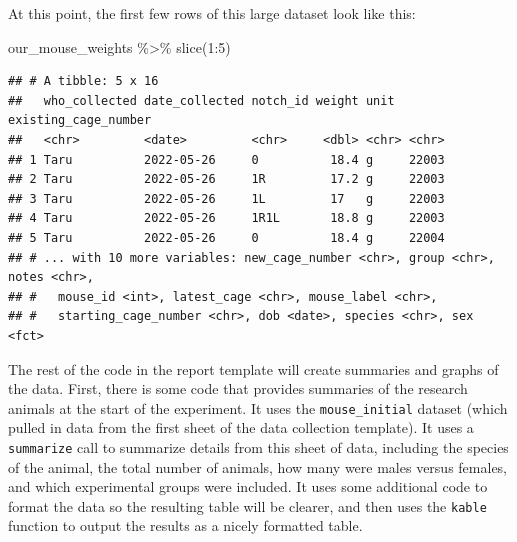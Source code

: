 \documentclass[
]{book}
\newenvironment{Shaded}{\begin{snugshade}}{\end{snugshade}}
\newcommand{\DecValTok}[1]{\textcolor[rgb]{0.00,0.00,0.81}{#1}}
\newcommand{\FunctionTok}[1]{\textcolor[rgb]{0.00,0.00,0.00}{#1}}
\newcommand{\NormalTok}[1]{#1}
\newcommand{\SpecialCharTok}[1]{\textcolor[rgb]{0.00,0.00,0.00}{#1}}
\begin{document}
At this point, the first few rows of this large dataset look like this:

\begin{Shaded}
\begin{Highlighting}[]
\NormalTok{our\_mouse\_weights }\SpecialCharTok{\%\textgreater{}\%} 
  \FunctionTok{slice}\NormalTok{(}\DecValTok{1}\SpecialCharTok{:}\DecValTok{5}\NormalTok{)}
\end{Highlighting}
\end{Shaded}

\begin{verbatim}
## # A tibble: 5 x 16
##   who_collected date_collected notch_id weight unit  existing_cage_number
##   <chr>         <date>         <chr>     <dbl> <chr> <chr>               
## 1 Taru          2022-05-26     0          18.4 g     22003               
## 2 Taru          2022-05-26     1R         17.2 g     22003               
## 3 Taru          2022-05-26     1L         17   g     22003               
## 4 Taru          2022-05-26     1R1L       18.8 g     22003               
## 5 Taru          2022-05-26     0          18.4 g     22004               
## # ... with 10 more variables: new_cage_number <chr>, group <chr>, notes <chr>,
## #   mouse_id <int>, latest_cage <chr>, mouse_label <chr>,
## #   starting_cage_number <chr>, dob <date>, species <chr>, sex <fct>
\end{verbatim}

The rest of the code in the report template will create summaries and graphs of the
data. First, there is some code that provides summaries of the research animals at
the start of the experiment. It uses the \texttt{mouse\_initial} dataset (which pulled
in data from the first sheet of the data collection template). It uses a
\texttt{summarize} call to summarize details from this sheet of data, including the
species of the animal, the total number of animals, how many were males versus
females, and which experimental groups were included. It uses some additional
code to format the data so the resulting table will be clearer, and then
uses the \texttt{kable} function to output the results as a nicely formatted table.
\end{document}
